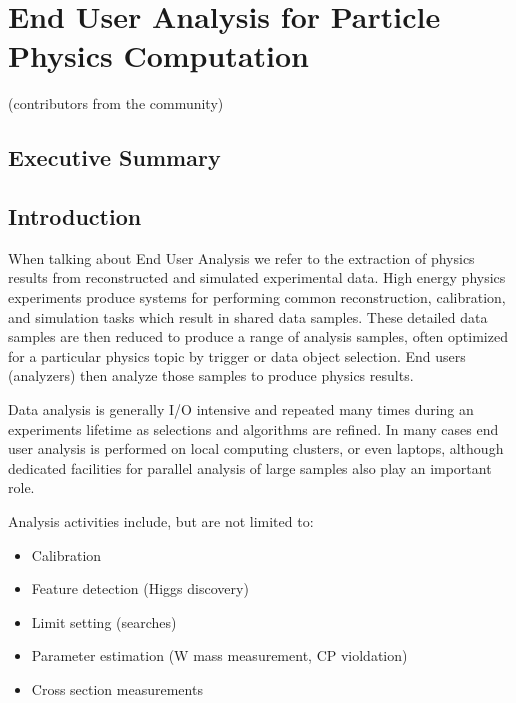 
\setcounter{chapter}{4} 


\chapter{End User Analysis for Particle Physics Computation}

   {(contributors from the community)}

\section{Executive Summary}

\section{Introduction}
When talking about End User Analysis we refer to the extraction of physics results from reconstructed and simulated experimental data. High energy physics experiments produce systems for performing common reconstruction, calibration, and simulation tasks which result in shared data samples. These detailed data samples are then reduced to produce a range of analysis samples, often optimized for a particular physics topic by trigger or data object selection. End users (analyzers) then analyze those samples to produce physics results.

Data analysis is generally I/O intensive and repeated many times during an experiments lifetime as selections and algorithms are refined. In many cases end user analysis is performed on local computing clusters, or even laptops, although dedicated facilities for parallel analysis of large samples also play an important role.

Analysis activities include, but are not limited to:
\begin{itemize}
  \item Calibration
  \item Feature detection (Higgs discovery)
  \item Limit setting (searches)
  \item Parameter estimation (W mass measurement, CP violdation)
  \item Cross section measurements
\end{itemize}


